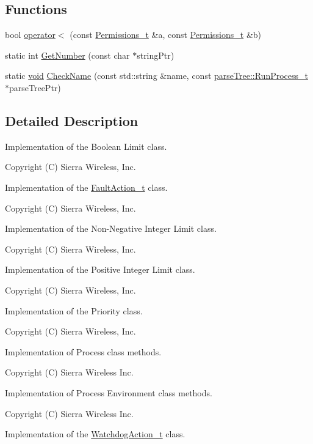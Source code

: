 \subsection*{Functions}
\begin{DoxyCompactItemize}
\item 
bool \hyperlink{namespacemodel_ae979a162c98f553e1f0508967819b680}{operator$<$} (const \hyperlink{structmodel_1_1_permissions__t}{Permissions\+\_\+t} \&a, const \hyperlink{structmodel_1_1_permissions__t}{Permissions\+\_\+t} \&b)
\item 
static int \hyperlink{namespacemodel_aeb5cea0dc4cb7332fd37987532532d67}{Get\+Number} (const char $\ast$string\+Ptr)
\item 
static \hyperlink{_t_e_m_p_l_a_t_e__cdef_8h_ac9c84fa68bbad002983e35ce3663c686}{void} \hyperlink{namespacemodel_a0c782093b1270ffe69fef026adcac554}{Check\+Name} (const std\+::string \&name, const \hyperlink{structparse_tree_1_1_run_process__t}{parse\+Tree\+::\+Run\+Process\+\_\+t} $\ast$parse\+Tree\+Ptr)
\end{DoxyCompactItemize}


\subsection{Detailed Description}
Implementation of the Boolean Limit class.

Copyright (C) Sierra Wireless, Inc.

Implementation of the \hyperlink{classmodel_1_1_fault_action__t}{Fault\+Action\+\_\+t} class.

Copyright (C) Sierra Wireless, Inc.

Implementation of the Non-\/\+Negative Integer Limit class.

Copyright (C) Sierra Wireless, Inc.

Implementation of the Positive Integer Limit class.

Copyright (C) Sierra Wireless, Inc.

Implementation of the Priority class.

Copyright (C) Sierra Wireless, Inc.

Implementation of Process class methods.

Copyright (C) Sierra Wireless Inc.

Implementation of Process Environment class methods.

Copyright (C) Sierra Wireless Inc.

Implementation of the \hyperlink{classmodel_1_1_watchdog_action__t}{Watchdog\+Action\+\_\+t} class.

